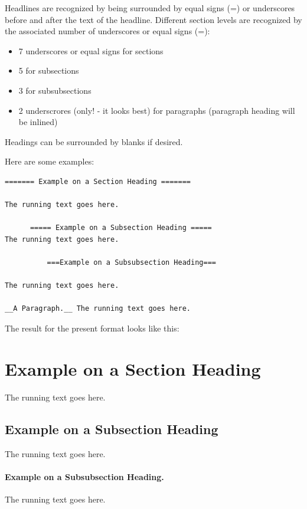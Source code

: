 \documentclass{article}
\begin{document}
 

Headlines are recognized by being surrounded by equal signs (=) or
underscores before and after the text of the headline. Different
section levels are recognized by the associated number of underscores
or equal signs (=):
\begin{itemize}
   \item 7 underscores or equal signs for sections
   \item 5 for subsections
   \item 3 for subsubsections
   \item 2 underscrores (only! - it looks best) for paragraphs 
     (paragraph heading will be inlined)
\end{itemize}
Headings can be surrounded by blanks if desired.

Here are some examples:
\begin{Verbatim}[fontsize=\fontsize{9pt}{9pt},tabsize=8,baselinestretch=0.85,
fontfamily=tt,xleftmargin=7mm]
======= Example on a Section Heading ======= 

The running text goes here. 

      ===== Example on a Subsection Heading ===== 
The running text goes here.

          ===Example on a Subsubsection Heading===

The running text goes here.

__A Paragraph.__ The running text goes here.
\end{Verbatim}
\noindent

The result for the present format looks like this:


\section{Example on a Section Heading}

The running text goes here. 

\subsection{Example on a Subsection Heading}

The running text goes here.
\paragraph{Example on a Subsubsection Heading.}

The running text goes here.
\end{document}
